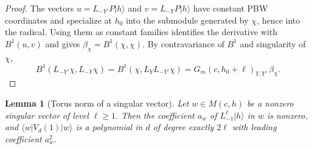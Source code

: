 \documentclass[twoside,10pt]{article}
\numberwithin{equation}{section}
\theoremstyle{slbody}
\newtheorem{lemma}[theorem]{Lemma}
\theoremstyle{definition}
\theoremstyle{remark}
\begin{document}
\begin{proof}
The vectors \(u=L_{-Y'}P|h\rangle\) and \(v=L_{-Y}P|h\rangle\) have
constant PBW coordinates and specialize at \(h_0\) into the submodule
generated by \(\chi\), hence into the radical.
Using them as constant families identifies the derivative with \(B^1(u,v)\)
and gives \(\beta_\chi=B^1(\chi,\chi)\). By contravariance of \(B^1\) and
singularity of \(\chi\),
\[
 B^1(L_{-Y'}\chi,L_{-Y}\chi)=B^1(\chi,L_YL_{-Y'}\chi)
 =G_m(c,h_0+\ell)_{Y,Y'}\,\beta_\chi .
\]
\end{proof}


\begin{lemma}[Torus norm of a singular vector]\label{lem:singular-degree}
Let \(w\in M(c,h)\) be a nonzero singular vector of level \(\ell\geq1\).
Then the coefficient \(a_w\) of \(L_{-1}^\ell\lvert h\rangle\) in \(w\) is
nonzero, and \(\langle w|V_d(1)|w\rangle\) is a polynomial in \(d\) of
degree exactly \(2\ell\) with leading coefficient \(a_w^2\).
\end{lemma}
\end{document}
